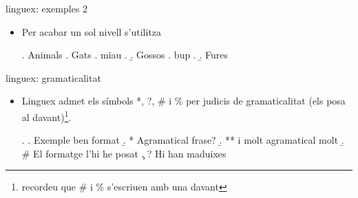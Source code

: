 \begin{frame}[fragile]{linguex: exemples 2}
\begin{itemize}
\item Per acabar un sol nivell s'utilitza 
\begin{exampletwouptiny2}
\ex. Animals
\a. Gats
\a. miau
\z.
\b. Gossos
\a. bup
\z.
\b. Fures

\end{exampletwouptiny2}
\end{itemize}

\end{frame}

\begin{frame}[fragile]{linguex: gramaticalitat}
\begin{itemize}
    \item Linguex admet els símbols *, ?, \# i \% per judicis de gramaticalitat (els posa al davant)\footnote{recordeu que \# i \% s'escriuen amb una \keystroke{\textbackslash} davant}.
\begin{exampletwouptiny2}
\ex.
\a. Exemple ben format
\b. * Agramatical frase?
\b. ** i molt agramatical molt
\b. \# El formatge l'hi he posat
\c. ? Hi han maduixes

\end{exampletwouptiny2}
\end{itemize}

\end{frame}

